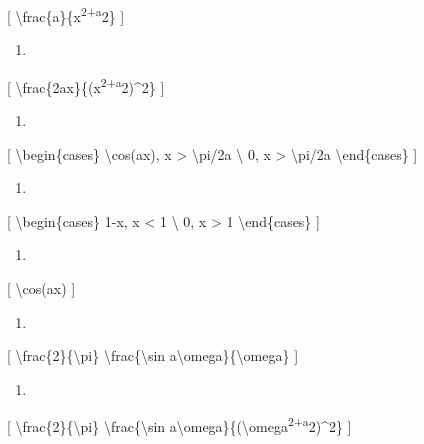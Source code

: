 \documentclass[
]{article}
\providecommand{\tightlist}{%
  \setlength{\itemsep}{0pt}\setlength{\parskip}{0pt}}
\begin{document}
{{[} \textbackslash frac\{a\}\{x\textsuperscript{2+a}2\} {]}

\begin{enumerate}
\def\labelenumi{\arabic{enumi}.}
\setcounter{enumi}{15}
\tightlist
\item
\end{enumerate}

{[} \textbackslash frac\{2ax\}\{(x\textsuperscript{2+a}2)\^{}2\} {]}

\begin{enumerate}
\def\labelenumi{\arabic{enumi}.}
\setcounter{enumi}{16}
\tightlist
\item
\end{enumerate}

{[} \textbackslash begin\{cases\} \textbackslash cos(ax),
\textbar x\textbar{} \textgreater{} \textbackslash pi/2a
\textbackslash{} 0, \textbar x\textbar{} \textgreater{}
\textbackslash pi/2a \textbackslash end\{cases\} {]}

\begin{enumerate}
\def\labelenumi{\arabic{enumi}.}
\setcounter{enumi}{17}
\tightlist
\item
\end{enumerate}

{[} \textbackslash begin\{cases\} 1-\textbar x\textbar,
\textbar x\textbar{} \textless{} 1 \textbackslash{} 0,
\textbar x\textbar{} \textgreater{} 1 \textbackslash end\{cases\} {]}

\begin{enumerate}
\def\labelenumi{\arabic{enumi}.}
\setcounter{enumi}{18}
\tightlist
\item
\end{enumerate}

{[} \textbackslash cos(ax) {]}

\begin{enumerate}
\def\labelenumi{\arabic{enumi}.}
\setcounter{enumi}{9}
\tightlist
\item
\end{enumerate}

{[} \textbackslash frac\{2\}\{\textbackslash pi\}
\textbackslash frac\{\textbackslash sin
a\textbackslash omega\}\{\textbackslash omega\} {]}

\begin{enumerate}
\def\labelenumi{\arabic{enumi}.}
\setcounter{enumi}{9}
\tightlist
\item
\end{enumerate}

{[} \textbackslash frac\{2\}\{\textbackslash pi\}
\textbackslash frac\{\textbackslash sin
a\textbackslash omega\}\{(\textbackslash omega\textsuperscript{2+a}2)\^{}2\}
{]}

}
\end{document}
